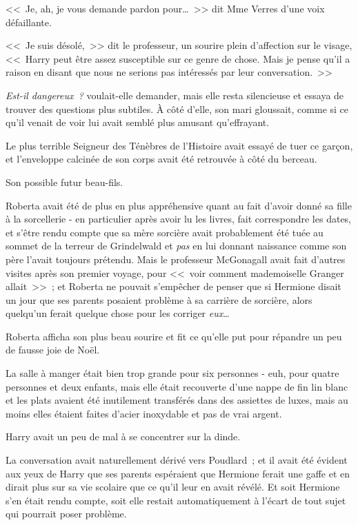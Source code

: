 <<~Je, ah, je vous demande pardon pour…~>> dit Mme Verres d'une voix défaillante.

<<~Je suis désolé,~>> dit le professeur, un sourire plein d'affection sur le visage, <<~Harry peut être assez susceptible sur ce genre de chose. Mais je pense qu'il a raison en disant que nous ne serions pas intéressés par leur conversation.~>>

\emph{Est-il dangereux~?} voulait-elle demander, mais elle resta silencieuse et essaya de trouver des questions plus subtiles. À côté d'elle, son mari gloussait, comme si ce qu'il venait de voir lui avait semblé plus amusant qu'effrayant.

Le plus terrible Seigneur des Ténèbres de l'Histoire avait essayé de tuer ce garçon, et l'enveloppe calcinée de son corps avait été retrouvée à côté du berceau.

Son possible futur beau-fils.

Roberta avait été de plus en plus appréhensive quant au fait d'avoir donné sa fille à la sorcellerie - en particulier après avoir lu les livres, fait correspondre les dates, et s'être rendu compte que sa mère sorcière avait probablement été tuée au sommet de la terreur de Grindelwald et \emph{pas} en lui donnant naissance comme son père l'avait toujours prétendu. Mais le professeur McGonagall avait fait d'autres visites après son premier voyage, pour <<~voir comment mademoiselle Granger allait~>>~; et Roberta ne pouvait s'empêcher de penser que si Hermione disait un jour que ses parents posaient problème à sa carrière de sorcière, alors quelqu'un ferait quelque chose pour les corriger \emph{eux}…

Roberta afficha son plus beau sourire et fit ce qu'elle put pour répandre un peu de fausse joie de Noël.

\later

La salle à manger était bien trop grande pour six personnes - euh, pour quatre personnes et deux enfants, mais elle était recouverte d'une nappe de fin lin blanc et les plats avaient été inutilement transférés dans des assiettes de luxes, mais au moins elles étaient faites d'acier inoxydable et pas de vrai argent.

Harry avait un peu de mal à se concentrer sur la dinde.

La conversation avait naturellement dérivé vers Poudlard~; et il avait été évident aux yeux de Harry que ses parents espéraient que Hermione ferait une gaffe et en dirait plus sur sa vie scolaire que ce qu'il leur en avait révélé. Et soit Hermione s'en était rendu compte, soit elle restait automatiquement à l'écart de tout sujet qui pourrait poser problème.

